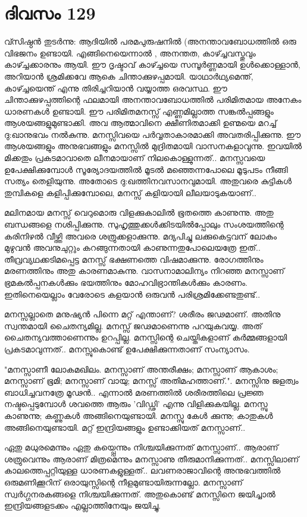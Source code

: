 \newpage
\section{ദിവസം 129}


വ്സിഷ്ഠന്‍ തുടര്‍ന്നു: ആദിയില്‍ പരമപുരുഷനില്‍ (അനന്താവബോധത്തില്‍ ഒരു വിഭജനം ഉണ്ടായി. എങ്ങിനെയെന്നാല്‍ , അനന്തത, കാഴ്ച്ചവസ്തുവും കാഴ്ച്ചക്കാരനും ആയി. ഈ ദൃഷ്ടാവ്‌ കാഴ്ച്ചയെ സമ്പൂര്‍ണ്ണമായി ഉള്‍ക്കൊള്ളാന്‍, അറിയാന്‍ ശ്രമിക്കവേ ആകെ ചിന്താക്കുഴപ്പമായി. യാഥാര്‍ഥ്യമെന്ത്‌, കാഴ്ച്ചയെന്ത്‌ എന്നു തിരിച്ചറിയാന്‍ വയ്യാത്ത ഒരവസ്ഥ. ഈ ചിന്താക്കുഴപ്പത്തിന്റെ ഫലമായി അനന്താവബോധത്തില്‍ പരിമിതമായ അനേകം ധാരണകള്‍ ഉണ്ടായി. ഈ പരിമിതമനസ്സ്‌ എണ്ണമില്ലാത്ത സങ്കല്‍പ്പങ്ങളും ആശയങ്ങളുമുണ്ടാക്കി. അവ ആത്മാവിനെ ക്ഷീണിതമാക്കി ഉണ്മയെ മറച്ച്‌ ദു:ഖാനുഭവം നല്‍കുന്നു. മനസ്സിവയെ പര്‍വ്വതാകാരമാക്കി അവതരിപ്പിക്കുന്നു. ഈ ആശയങ്ങളും അനുഭവങ്ങളും മനസ്സില്‍ മുദ്രിതമായി വാസനകളാവുന്നു. ഇവയില്‍ മിക്കതും പ്രകടമാവാതെ ലീനമായാണ്‌ നിലകൊള്ളുന്നത്‌.. മനസ്സവയെ ഉപേക്ഷിക്കുമ്പോള്‍ സൂര്യോദയത്തില്‍ മൂടല്‍ മഞ്ഞെന്നപോലെ മൂടുപടം നീങ്ങി സത്യം തെളിയുന്നു. അതോടെ ദു:ഖത്തിനവസാനവുമായി. അതുവരെ കുട്ടികള്‍ തുമ്പികളെ കളിപ്പിക്കുമ്പോലെ, മനസ്സ്‌ കളിയായി ലീലയാടുകയാണ്‌..

മലിനമായ മനസ്സ്‌ വെറുമൊരു വിളക്കുകാലില്‍ ഭൂതത്തെ കാണുന്നു. അതു ബന്ധങ്ങളെ നശിപ്പിക്കുന്നു. സുഹൃത്തുക്കള്‍ക്കിടയില്‍പ്പോലും സംശയത്തിന്റെ കരിനിഴല്‍ വീഴ്ത്തി അവരെ ശത്രുക്കളാക്കുന്നു. മദ്യപിച്ചു ലക്കുകെട്ടവന്‌ ലോകം മുഴുവന്‍ അവനുചുറ്റും കറങ്ങുന്നതായി കാണുന്നതുപോലെയത്രേ ഇത്‌.. തീവ്രവ്യഥക്കടിമപ്പെട്ട മനസ്സ്‌ ഭക്ഷണത്തെ വിഷമാക്കുന്നു. രോഗത്തിനും മരണത്തിനും അതു കാരണമാകുന്നു. വാസനാമാലിന്യം നിറഞ്ഞ മനസ്സാണ്‌ ഭ്രമകല്‍പ്പനകള്‍ക്കും ഭയത്തിനും മോഹവിഭ്രാന്തികള്‍ക്കും കാരണം. ഇതിനെയെല്ലാം വേരോടെ കളയാന്‍ ഒരുവന്‍ പരിശ്രമിക്കേണ്ടതുണ്ട്‌..

മനസ്സല്ലാതെ മനുഷ്യന്‍ പിന്നെ മറ്റ്‌ എന്താണ്‌? ശരീരം ജഢമാണ്‌. അതിനു സ്വന്തമായി ചൈതന്യമില്ല. മനസ്സ്‌ ജഢമാണെന്നു പറയുകവയ്യ. അത്‌ ചൈതന്യവത്താണെന്നും ഉറപ്പില്ല. മനസ്സിന്റെ ചെയ്തികളാണ്‌ കര്‍മ്മങ്ങളായി പ്രകടമാവുന്നത്‌.. മനസ്സുകൊണ്ട്‌ ഉപേക്ഷിക്കുന്നതാണ്‌ സംന്യാസം.

"മനസ്സാണീ ലോകമഖിലം. മനസ്സാണ്‌ അന്തരീക്ഷം; മനസ്സാണ്‌ ആകാശം; മനസ്സാണ്‌ ഭൂമി; മനസ്സാണ്‌ വായു; മനസ്സ്‌ അതിമഹത്താണ്‌.". മനസ്സിനു ജളത്വം ബാധിച്ചവനത്രേ മൂഢന്‍.. എന്നാല്‍ മരണത്തില്‍ ശരീരത്തിലെ പ്രജ്ഞ നഷ്ടപ്പെടുമ്പോള്‍ ശവത്തെ ആരും 'വിഡ്ഢി' എന്നു വിളിക്കുകയില്ല. മനസ്സു കാണുന്നു; കണ്ണുകള്‍ അങ്ങിനെയുണ്ടായി. മനസ്സു കേള്‍ ക്കുന്നു; കാതുകള്‍ അങ്ങിനെയുണ്ടായി. മറ്റ്‌ ഇന്ദ്രിയങ്ങളും ഉണ്ടാക്കിയത്‌ മനസ്സാണ്‌..

ഏതു മധുരമെന്നും ഏതു കയ്പ്പെന്നും നിശ്ചയിക്കുന്നത്‌ മനസ്സാണ്‌.. ആരാണ്‌ ശത്രുവെന്നും ആരാണ്‌ മിത്രമെന്നും മനസ്സാണു തീരുമാനിക്കുന്നത്‌.. മനസ്സിലാണ്‌ കാലത്തെപ്പറ്റിയുള്ള ധാരണകളുള്ളത്‌.. ലവണരാജാവിന്റെ അനുഭവത്തില്‍ ഒരുമണിക്കൂറിന്‌ ഒരായുസ്സിന്റെ നീളമുണ്ടായിരുന്നല്ലോ. മനസ്സാണ്‌ സ്വര്‍ഗ്ഗനരകങ്ങളെ നിശ്ചയിക്കുന്നത്‌. അതുകൊണ്ട്‌ മനസ്സിനെ ജയിച്ചാല്‍ ഇന്ദ്രിയങ്ങളടക്കം എല്ലാത്തിനേയും ജയിച്ചു. 

